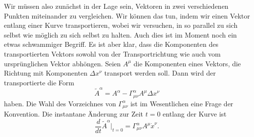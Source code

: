 Wir müssen also zunächst in der Lage sein, Vektoren in zwei verschiedenen
Punkten miteinander zu vergleichen.
Wir können das tun, indem wir einen Vektor entlang einer Kurve transportieren,
wobei wir versuchen, in so parallel zu sich selbst wie möglich zu sich
selbst zu halten.
Auch dies ist im Moment noch ein etwas schwammiger Begriff. 
Es ist aber klar, dass die Komponenten des transportierten Vektors
sowohl von der Transportrichtung wie auch vom ursprünglichen Vektor
abhöngen.
Seien $A^\mu$ die Komponenten eines Vektors, die Richtung mit Komponenten
$\Delta x^\nu$ transport werden soll.
Dann wird der transportierte die Form
\[
\tilde A^\alpha
=
A^\alpha - \Gamma_{\mu\nu}^\alpha A^\mu \Delta x^\nu
\]
haben.
Die Wahl des Vorzeichnes von $\Gamma_{\mu\nu}^\alpha$ ist im Wesentlichen
eine Frage der Konvention.
Die instantane Änderung zur Zeit $t=0$ entlang der Kurve ist
\[
\frac{d}{dt}\tilde A^\alpha\bigg|_{t=0}
=
\Gamma_{\mu\nu}^\alpha A^\mu \dot x^\nu.
\]

